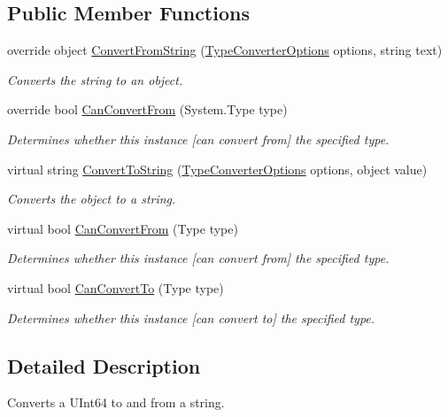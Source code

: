 \subsection*{Public Member Functions}
\begin{DoxyCompactItemize}
\item 
override object \hyperlink{a00186_a1d3e86ea3d34de0d47a365c9b8622eb7}{Convert\-From\-String} (\hyperlink{a00180}{Type\-Converter\-Options} options, string text)
\begin{DoxyCompactList}\small\item\em Converts the string to an object. \end{DoxyCompactList}\item 
override bool \hyperlink{a00186_a3d9e9527b77fbf94786f2e5b8c4e5829}{Can\-Convert\-From} (System.\-Type type)
\begin{DoxyCompactList}\small\item\em Determines whether this instance \mbox{[}can convert from\mbox{]} the specified type. \end{DoxyCompactList}\item 
virtual string \hyperlink{a00090_a36cb2f9b24f15a671293f3a722324c27}{Convert\-To\-String} (\hyperlink{a00180}{Type\-Converter\-Options} options, object value)
\begin{DoxyCompactList}\small\item\em Converts the object to a string. \end{DoxyCompactList}\item 
virtual bool \hyperlink{a00090_a470d21adaa704eb281250dbd112ff91a}{Can\-Convert\-From} (Type type)
\begin{DoxyCompactList}\small\item\em Determines whether this instance \mbox{[}can convert from\mbox{]} the specified type. \end{DoxyCompactList}\item 
virtual bool \hyperlink{a00090_acb65bd8c8199d88d5b1629ae35d18514}{Can\-Convert\-To} (Type type)
\begin{DoxyCompactList}\small\item\em Determines whether this instance \mbox{[}can convert to\mbox{]} the specified type. \end{DoxyCompactList}\end{DoxyCompactItemize}


\subsection{Detailed Description}
Converts a U\-Int64 to and from a string. 



